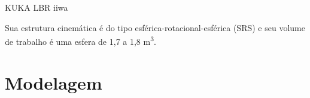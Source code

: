 \documentclass[aspectratio=169]{beamer}
\begin{document}
\begin{frame}{KUKA LBR iiwa}
\begin{minipage}{0.45\textwidth}
\end{minipage}\hfill
\begin{minipage}{0.53\textwidth}
    Sua estrutura cinemática é do tipo esférica-rotacional-esférica (SRS) e seu volume de trabalho é uma esfera de 1,7 a 1,8 \si{m^3}.
\end{minipage}
\end{frame}

\section{Modelagem}
\end{document}
